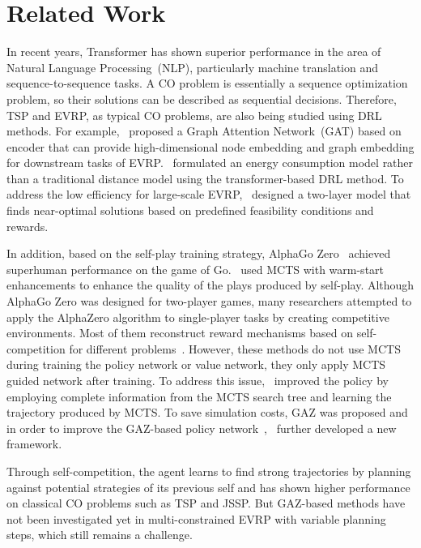\section{Related Work}
In recent years, Transformer has shown superior performance in the area of Natural Language Processing~(NLP), particularly machine translation and sequence-to-sequence tasks. A CO problem is essentially a sequence optimization problem, so their solutions can be described as sequential decisions. Therefore, TSP and EVRP, as typical CO problems, are also being studied using DRL methods. For example,~\cite{10608117} proposed a Graph Attention Network~(GAT) based on encoder that can provide high-dimensional node embedding and graph embedding for downstream tasks of EVRP.~\cite{TANG2023121711} formulated an energy consumption model rather than a traditional distance model using the transformer-based DRL method. To address the low efficiency for large-scale EVRP,~\cite{9924526} designed a two-layer model that finds near-optimal solutions based on predefined feasibility conditions and rewards. 

In addition, based on the self-play training strategy, AlphaGo Zero~\cite{Silver2018AGR} achieved superhuman performance on the game of Go.~\cite{Wang2021AdaptiveWM} used MCTS with warm-start enhancements to enhance the quality of the plays produced by self-play. Although AlphaGo Zero was designed for two-player games, many researchers attempted to apply the AlphaZero algorithm to single-player tasks by creating competitive environments. Most of them reconstruct reward mechanisms based on self-competition for different problems~\cite{Bansal2017EmergentCV,laterre2018ranked,9356942}. However, these methods do not use MCTS during training the policy network or value network, they only apply MCTS guided network after training. To address this issue,~\cite{WANG2021104422} improved the policy by employing complete information from the MCTS search tree and learning the trajectory produced by MCTS. To save simulation costs, GAZ was proposed and in order to improve the GAZ-based policy network~\cite{Danihelka2022PolicyIB},~\cite{0547ebb970b949cf8ec4326c525f408a} further developed a new framework. 

Through self-competition, the agent learns to find strong trajectories by planning against potential strategies of its previous self and has shown higher performance on classical CO problems such as TSP and JSSP. But GAZ-based methods have not been investigated yet in multi-constrained EVRP with variable planning steps, which still remains a challenge.